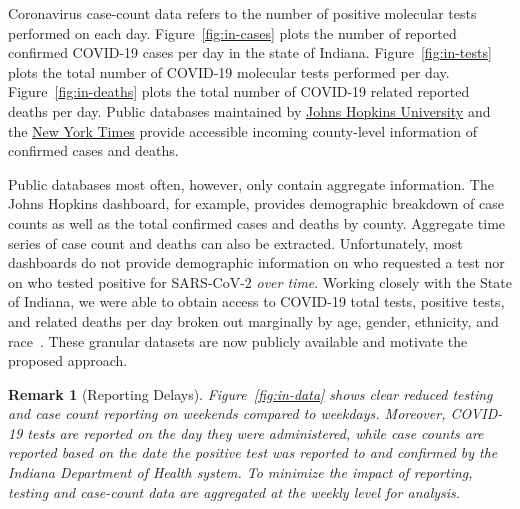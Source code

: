 \documentclass[11pt]{amsart}
\numberwithin{equation}{section}
\theoremstyle{plain}
\newtheorem{remark}{Remark}
\begin{document}
 Coronavirus case-count data refers to the number of positive molecular tests performed on each day.  Figure~\ref{fig:in-cases} plots the number of reported confirmed COVID-19 cases per day in the state of Indiana.  Figure~\ref{fig:in-tests} plots the total number of COVID-19 molecular tests performed per day. Figure~\ref{fig:in-deaths} plots the total number of COVID-19 related reported deaths per day. Public databases maintained by \href{https://bit.ly/2UqFSuA}{Johns Hopkins University} and the \href{https://bit.ly/2vUHfrK}{New York Times} provide accessible incoming county-level information of confirmed cases and deaths.

 Public databases most often, however, only contain aggregate information.  The Johns Hopkins dashboard, for example, provides demographic breakdown of case counts as well as the total confirmed cases and deaths by county.  Aggregate time series of case count and deaths can also be extracted.  Unfortunately, most dashboards do not provide demographic information on who requested a test nor on who tested positive for SARS-CoV-2 \emph{over time}. Working closely with the State of Indiana, we were able to obtain access to COVID-19 total tests, positive tests, and related deaths per day broken out marginally by age, gender, ethnicity, and race~\citep{IndianaData2021}.  These granular datasets are now publicly available and motivate the proposed approach.

\begin{remark}[Reporting Delays]
Figure~\ref{fig:in-data} shows clear reduced testing and case count reporting on weekends compared to weekdays. Moreover, COVID-19 tests are reported on the day they were administered, while case counts are reported based on the date the positive test was reported to and confirmed by the Indiana Department of Health system.  To minimize the impact of reporting, testing and case-count data are aggregated at the weekly level for analysis.
 \end{remark}
\end{document}
